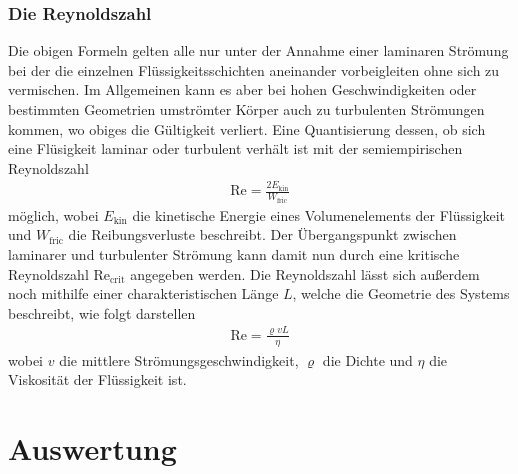 \documentclass[12pt,a4paper,german]{scrartcl}
\numberwithin{equation}{section}
\begin{document}
  \subsubsection{Die Reynoldszahl}
  Die obigen Formeln gelten alle nur unter der Annahme einer laminaren Strömung bei der die einzelnen Flüssigkeitsschichten aneinander vorbeigleiten ohne sich zu vermischen. Im Allgemeinen kann es aber bei hohen Geschwindigkeiten oder bestimmten Geometrien umströmter Körper auch zu turbulenten Strömungen kommen, wo obiges die Gültigkeit verliert.
  Eine Quantisierung dessen, ob sich eine Flüsigkeit laminar oder turbulent verhält ist mit der semiempirischen Reynoldszahl
  \begin{align}
    \text{Re} = \frac{2 E_\text{kin}}{W_\text{fric}}
  \end{align}
  möglich, wobei $E_\text{kin}$ die kinetische Energie eines Volumenelements der Flüssigkeit und $W_\text{fric}$ die Reibungsverluste beschreibt.
  Der Übergangspunkt zwischen laminarer und turbulenter Strömung kann damit nun durch eine kritische Reynoldszahl $\text{Re}_\text{crit}$ angegeben werden.
  Die Reynoldszahl lässt sich außerdem noch mithilfe einer charakteristischen Länge $L$, welche die Geometrie des Systems beschreibt, wie folgt darstellen
  \begin{align}
    \text{Re} = \frac{\varrho v L}{\eta}
  \end{align}
  wobei $v$ die mittlere Strömungsgeschwindigkeit, $\varrho$ die Dichte und $\eta$ die Viskosität der Flüssigkeit ist.

  \newpage
  \section{Auswertung}
\end{document}
